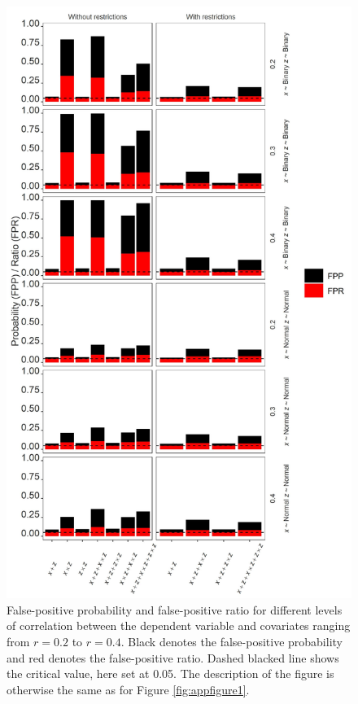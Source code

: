 \begin{landscape}
\begin{figure}[ht!]
\includegraphics[scale=0.16]{R/Analysis/Result/Figures/Figure2SI.jpeg}
\centering
\caption{False-positive probability and false-positive ratio for different levels of correlation between the dependent variable and covariates ranging from  $\textit{r}=0.2$ to  $\textit{r}=0.4$. Black denotes the false-positive probability and red denotes the false-positive ratio. Dashed blacked line shows the critical value, here set at 0.05. The description of the figure is otherwise the same as for Figure \ref{fig:appfigure1}.}
\label{fig:appfigure2}
\end{figure}
\end{landscape}


